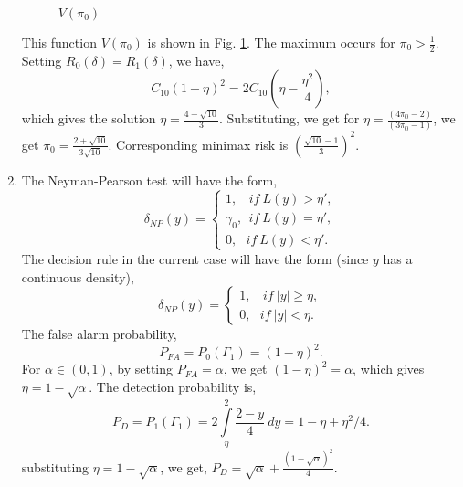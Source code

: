 \documentclass[a4paper,english,10pt]{article}
\begin{document}
\begin{enumerate}[label=(\alph{*}).]
\begin{figure*}[h]
\centering
{}
\caption{$V(\pi_0)$}
\label{fig:prob4}
\end{figure*}
This function $V(\pi_0)$ is shown in Fig. \ref{fig:prob4}. The maximum occurs for $\pi_0>\frac{1}{2}$. 
Setting $R_0(\delta)=R_1(\delta)$, we have,
\begin{equation*}
C_{10} (1-\eta)^2=2C_{10} (\eta-\frac{\eta^2}{4}),
\end{equation*}
which gives the solution $\eta=\frac{4- \sqrt{10}}{3}$. Substituting, we get for $\eta=\frac{(4\pi_0-2)}{(3\pi_0-1)}$, we get $\pi_0=\frac{2+\sqrt{10}}{3\sqrt{10}}$. Corresponding minimax risk is $(\frac{\sqrt{10}-1}{3})^2$.
\item 
The Neyman-Pearson test will have the form,
 \begin{equation*}
	\delta_{NP}(y)=\begin{cases}
		1,~~~~if~L(y)> \eta',\\
		\gamma_0,~~if~L(y)=\eta',\\
		0,~~~if~L(y)<\eta'.
	\end{cases}
 \end{equation*}
 The decision rule in the current case will have the form (since $y$ has a continuous density),
  \begin{equation*}
 	\delta_{NP}(y)=\begin{cases}
 		1,~~~~if~|y|\geq \eta,\\
 		0,~~~if~|y|<\eta.
 	\end{cases}
  \end{equation*}
The false alarm probability,
\begin{equation*}
P_{FA}=P_0(\Gamma_1)=(1-\eta)^2.
\end{equation*}  
For $\alpha\in(0,1)$, by setting $P_{FA}=\alpha$, we get $(1-\eta)^2=\alpha$, which gives $\eta=1-\sqrt{\alpha}$. The detection probability is,
\begin{equation*}
P_D=P_1(\Gamma_1)=2 \int\limits_{\eta}^{2} \frac{2-y}{4}~dy=1-\eta+\eta^2/4.
\end{equation*}
substituting $\eta=1-\sqrt{\alpha}$, we get, $P_D=\sqrt{\alpha}+\frac{(1-\sqrt{\alpha})^2}{4}$.
\end{enumerate}
\end{document}
